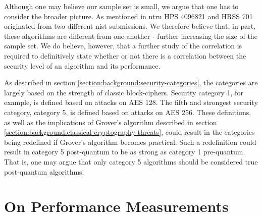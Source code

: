 Although one may believe our sample set is small, we argue that one has to consider the broader picture. As mentioned in \gls{ntru} HPS 4096821 and HRSS 701 originated from two different \gls{nist} submissions. We therefore believe that, in part, these algorithms are different from one another - further increasing the size of the sample set. We do believe, however, that a further study of the correlation is required to definitively state whether or not there is a correlation between the security level of an algorithm and its performance.

As described in section \ref{section:background:security-categories}, the categories are largely based on the strength of classic block-ciphers. Security category 1, for example, is defined based on attacks on AES 128. The fifth and strongest security category, category 5, is defined based on attacks on AES 256. These definitions, as well as the implications of Grover's algorithm described in section \ref{section:background:classical-cryptography-threats}, could result in the categories being redefined if Grover's algorithm becomes practical. Such a redefinition could result in category 5 post-quantum to be as strong as category 1 pre-quantum. That is, one may argue that only category 5 algorithms should be considered true post-quantum algorithms.


\section{On Performance Measurements}

